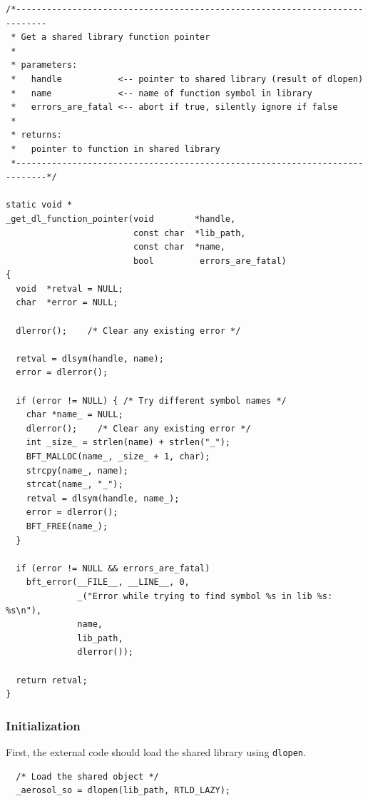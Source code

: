\documentclass[a4paper,11pt]{article}
\begin{document}
\begin{verbatim}
/*----------------------------------------------------------------------------
 * Get a shared library function pointer
 *
 * parameters:
 *   handle           <-- pointer to shared library (result of dlopen)
 *   name             <-- name of function symbol in library
 *   errors_are_fatal <-- abort if true, silently ignore if false
 *
 * returns:
 *   pointer to function in shared library
 *----------------------------------------------------------------------------*/

static void *
_get_dl_function_pointer(void        *handle,
                         const char  *lib_path,
                         const char  *name,
                         bool         errors_are_fatal)
{
  void  *retval = NULL;
  char  *error = NULL;

  dlerror();    /* Clear any existing error */

  retval = dlsym(handle, name);
  error = dlerror();

  if (error != NULL) { /* Try different symbol names */
    char *name_ = NULL;
    dlerror();    /* Clear any existing error */
    int _size_ = strlen(name) + strlen("_");
    BFT_MALLOC(name_, _size_ + 1, char);
    strcpy(name_, name);
    strcat(name_, "_");
    retval = dlsym(handle, name_);
    error = dlerror();
    BFT_FREE(name_);
  }

  if (error != NULL && errors_are_fatal)
    bft_error(__FILE__, __LINE__, 0,
              _("Error while trying to find symbol %s in lib %s: %s\n"),
              name,
              lib_path,
              dlerror());

  return retval;
}
\end{verbatim}

\subsubsection*{Initialization}

First, the external code should load the shared library using \texttt{dlopen}.
\begin{verbatim}
  /* Load the shared object */
  _aerosol_so = dlopen(lib_path, RTLD_LAZY);
\end{verbatim}
\end{document}
